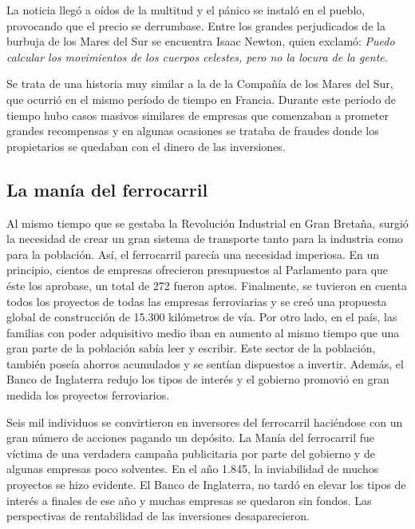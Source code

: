 La noticia llegó a oídos de la multitud y el pánico se instaló en el pueblo, provocando que el precio se derrumbase. Entre los grandes perjudicados de la burbuja de los Mares del Sur se encuentra Isaac Newton, quien exclamó: \emph{Puedo calcular los movimientos de los cuerpos celestes, pero no la locura de la gente}. 

Se trata de una historia muy similar a la de la Compañía de los Mares del Sur, que ocurrió en el mismo período de tiempo en Francia. Durante este período de tiempo hubo casos masivos similares de empresas que comenzaban a prometer grandes recompensas y en algunas ocasiones se trataba de fraudes donde los propietarios se quedaban con el dinero de las inversiones.


\subsection{La manía del ferrocarril}  

Al mismo tiempo que se gestaba la Revolución Industrial en Gran Bretaña, surgió la necesidad de crear un gran sistema de transporte tanto para la industria como para la población. Así, el ferrocarril parecía una necesidad imperiosa. En un principio, cientos de empresas ofrecieron presupuestos al Parlamento para que éste los aprobase, un total de 272 fueron aptos. Finalmente, se tuvieron en cuenta todos los proyectos de todas las empresas ferroviarias y se creó una propuesta global de construcción de 15.300 kilómetros de vía. Por otro lado, en el país, las familias con poder adquisitivo medio iban en aumento al mismo tiempo que una gran parte de la población sabía leer y escribir. Este sector de la población, también poseía ahorros acumulados y se sentían dispuestos a invertir. Además, el Banco de Inglaterra redujo los tipos de interés y el gobierno promovió en gran medida los proyectos ferroviarios.

Seis mil individuos se convirtieron en inversores del ferrocarril haciéndose con un gran número de acciones pagando un depósito. La Manía del ferrocarril fue víctima de una verdadera campaña publicitaria por parte del gobierno y de algunas empresas poco solventes. En el año 1.845, la inviabilidad de muchos proyectos se hizo evidente. El Banco de Inglaterra, no tardó en elevar los tipos de interés a finales de ese año y muchas empresas se quedaron sin fondos. Las perspectivas de rentabilidad de las inversiones desaparecieron.


